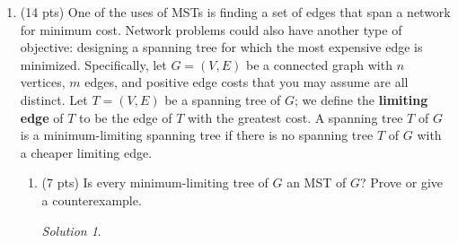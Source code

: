 \documentclass[12pt]{article}
\theoremstyle{remark}
\newtheorem*{solution}{Solution}
\begin{document}
\begin{enumerate}
\pagebreak
\item (14 pts) One of the uses of MSTs is finding a set of edges that span a network for minimum cost. Network problems could also have another type of objective: designing a spanning tree for which the most expensive edge is minimized. Specifically, let $G = (V, E)$ be a connected graph with $n$ vertices, $m$ edges, and positive edge costs that you may assume are all distinct. Let $T = (V, E)$ be a spanning tree of $G$; we define the \textbf{limiting edge} of $T$ to be the edge of $T$ with the greatest cost.
A spanning tree $T$ of $G$ is a minimum-limiting spanning tree if there is no spanning tree $T$ of $G$ with a cheaper limiting edge.
\begin{enumerate}
\item (7 pts) Is every minimum-limiting tree of $G$ an MST of $G$? Prove or give a counterexample.
\begin{solution}

\end{solution}
\end{enumerate}
\end{enumerate}
\end{document}
